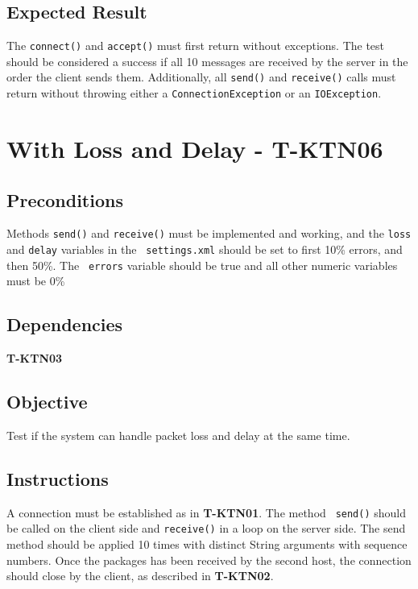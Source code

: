\documentclass{article}
\begin{document}
\subsection{Expected Result}

The \texttt{connect()} and \texttt{accept()} must first return without
exceptions. The test should be considered a success if all 10 messages are
received by the server in the order the client sends them. Additionally, all 
\texttt{send()} and \texttt{receive()} calls must return without throwing
either a \texttt{ConnectionException} or an \texttt{IOException}.

\section{With Loss and Delay - T-KTN06}

\subsection{Preconditions}

Methods \texttt{send()} and \texttt{receive()} must be implemented and
working, and the \texttt{loss} and \texttt{delay} variables in the \texttt{%
settings.xml} should be set to first 10\% errors, and then 50\%. The \texttt{%
errors} variable should be true and all other numeric variables must be 0\%

\subsection{Dependencies}

\textbf{T-KTN03}

\subsection{Objective}

Test if the system can handle packet loss and delay at the same time.

\subsection{Instructions}

A connection must be established as in \textbf{T-KTN01}. The method \texttt{%
send()} should be called on the client side and \texttt{receive()} in a loop
on the server side. The send method should be applied 10 times with distinct
String arguments with sequence numbers. Once the packages has been received
by the second host, the connection should close by the client, as described
in \textbf{T-KTN02}. 
\end{document}
